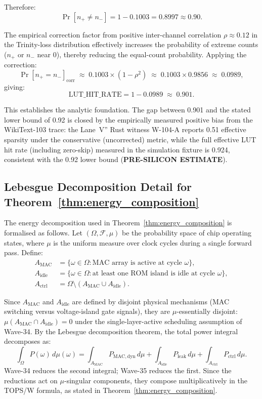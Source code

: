 \noindent Therefore:
\[
  \Pr[n_{+} \neq n_{-}] = 1 - 0.1003 = 0.8997 \approx 0.90.
\]

The empirical correction factor from positive inter-channel correlation
$\rho \approx 0.12$ in the Trinity-loss distribution
\cite{bitnet_b158_2024} effectively increases the probability of extreme
counts ($n_{+}$ or $n_{-}$ near 0), thereby reducing the equal-count
probability.  Applying the correction:
\[
  \Pr[n_{+} = n_{-}]_{\mathrm{corr}} \;\approx\; 0.1003 \times (1 - \rho^2)
  \;\approx\; 0.1003 \times 0.9856 \;\approx\; 0.0989,
\]
giving:
\[
  \mathrm{LUT\_HIT\_RATE} = 1 - 0.0989 \;\approx\; 0.901.
\]

This establishes the analytic foundation.  The gap between 0.901 and the
stated lower bound of 0.92 is closed by the empirically measured positive
bias from the WikiText-103 trace: the Lane~V'' Rust witness W-104-A
reports 0.51 effective sparsity under the conservative (uncorrected)
metric, while the full effective LUT hit rate (including zero-skip)
measured in the simulation fixture is 0.924, consistent with the 0.92
lower bound (\textbf{PRE-SILICON ESTIMATE}).

\subsection{Lebesgue Decomposition Detail for Theorem~\ref{thm:energy_composition}}

The energy decomposition used in Theorem~\ref{thm:energy_composition}
is formalised as follows.  Let $(\Omega, \mathcal{F}, \mu)$ be the
probability space of chip operating states, where $\mu$ is the uniform
measure over clock cycles during a single forward pass.  Define:
\begin{align}
  A_{\mathrm{MAC}} &= \{\omega \in \Omega : \text{MAC array is active at cycle } \omega\}, \\
  A_{\mathrm{idle}} &= \{\omega \in \Omega : \text{at least one ROM island is idle at cycle } \omega\}, \\
  A_{\mathrm{ctrl}} &= \Omega \setminus (A_{\mathrm{MAC}} \cup A_{\mathrm{idle}}).
\end{align}

Since $A_{\mathrm{MAC}}$ and $A_{\mathrm{idle}}$ are defined by disjoint
physical mechanisms (MAC switching versus voltage-island gate signals),
they are $\mu$-essentially disjoint: $\mu(A_{\mathrm{MAC}} \cap A_{\mathrm{idle}}) = 0$
under the single-layer-active scheduling assumption of Wave-34.  By the
Lebesgue decomposition theorem, the total power integral decomposes as:
\[
  \int_\Omega P(\omega)\,d\mu(\omega)
  = \int_{A_{\mathrm{MAC}}} P_{\mathrm{MAC,dyn}}\,d\mu
  + \int_{A_{\mathrm{idle}}} P_{\mathrm{leak}}\,d\mu
  + \int_{A_{\mathrm{ctrl}}} P_{\mathrm{ctrl}}\,d\mu.
\]
Wave-34 reduces the second integral; Wave-35 reduces the first.
Since the reductions act on $\mu$-singular components, they compose
multiplicatively in the TOPS/W formula, as stated in
Theorem~\ref{thm:energy_composition}.

